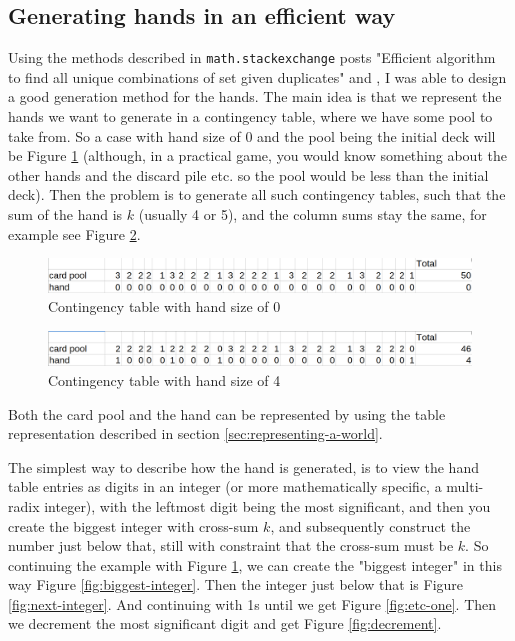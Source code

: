 \subsection{Generating hands in an efficient way} \label{sec:efficient-generation-of-hands}
Using the methods described in {\tt math.stackexchange} posts "Efficient algorithm to find all unique combinations of set given duplicates" \cite{HardmathcontigencyTablePost} and \cite{GCabrecursiveGenerationPost}, I was able to design a good generation method for the hands.
The main idea is that we represent the hands we want to generate in a contingency table, where we have some pool to take from.
So a case with hand size of 0 and the pool being the initial deck will be Figure \ref{fig:hand-pool-table} (although, in a practical game, you would know something about the other hands and the discard pile etc. so the pool would be less than the initial deck).
Then the problem is to generate all such contingency tables, such that the sum of the hand is $k$ (usually 4 or 5), and the column sums stay the same, for example see Figure \ref{fig:hand-pool-table-with-hand}.

\begin{figure}
	\centering
\includegraphics[width=13cm,frame]{images/contigency_table.png}
	\caption{Contingency table with hand size of 0}
	\label{fig:hand-pool-table}
\end{figure}


\begin{figure}
	\centering
\includegraphics[width=13cm,frame]{images/contigency_table_with_hand.png}
	\caption{Contingency table with hand size of 4}
	\label{fig:hand-pool-table-with-hand}
\end{figure}

Both the card pool and the hand can be represented by using the table representation described in section \ref{sec:representing-a-world}.

The simplest way to describe how the hand is generated, is to view the hand table entries as digits in an integer (or more mathematically specific, a multi-radix integer), with the leftmost digit being the most significant, and then you create the biggest integer with cross-sum $k$, and subsequently construct the number just below that, still with constraint that the cross-sum must be $k$.
So continuing the example with Figure \ref{fig:hand-pool-table}, we can create the "biggest integer" in this way Figure \ref{fig:biggest-integer}.
Then the integer just below that is Figure \ref{fig:next-integer}.
And continuing with 1s until we get Figure \ref{fig:etc-one}.
Then we decrement the most significant digit and get Figure \ref{fig:decrement}.

